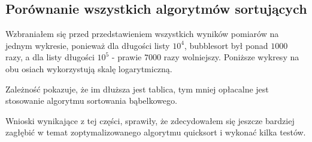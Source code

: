 \documentclass[12pt,a4paper]{article}
\begin{document}
\subsection*{Porównanie wszystkich algorytmów sortujących}
Wzbraniałem się przed przedstawieniem wszystkich wyników pomiarów na jednym wykresie, ponieważ dla długości listy $10^4$, bubblesort był ponad $1000$ razy, a dla listy długości $10^5$ - prawie $7000$ razy wolniejszy. Poniższe wykresy na obu osiach wykorzystują skalę logarytmiczną.
\begin{figure}[h!]
  \begin{center}
  \end{center}
\end{figure}
Zależność pokazuje, że im dłuższa jest tablica, tym mniej opłacalne jest stosowanie algorytmu sortowania bąbelkowego. \par
Wnioski wynikające z tej części, sprawiły, że zdecydowałem się jeszcze bardziej zagłębić w temat zoptymalizowanego algorytmu quicksort i wykonać kilka testów.
\newpage
\end{document}
